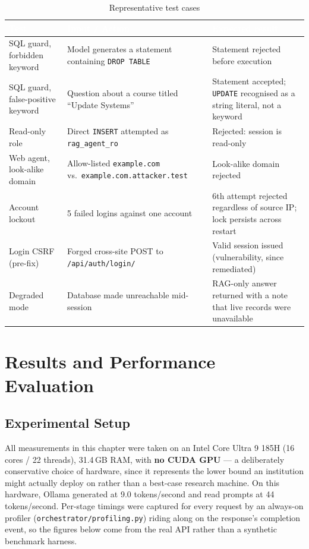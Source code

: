 \documentclass[11pt,a4paper,oneside]{report}
\begin{document}
\begin{table}[h]
\centering
\caption{Representative test cases}
\renewcommand{\arraystretch}{1.4}
\begin{tabularx}{\linewidth}{|>{\raggedright\arraybackslash}p{3.4cm}|X|X|}
\hline
\rowcolor{hdrnavy}
\textcolor{white}{Test} & \textcolor{white}{Input / Action} &
\textcolor{white}{Expected result} \\
\hline
SQL guard, forbidden keyword & Model generates a statement containing
  \texttt{DROP TABLE} & Statement rejected before execution \\
\hline
SQL guard, false-positive keyword & Question about a course titled
  ``Update Systems'' & Statement accepted; \texttt{UPDATE} recognised as a
  string literal, not a keyword \\
\hline
Read-only role & Direct \texttt{INSERT} attempted as
  \texttt{rag\_agent\_ro} & Rejected: session is read-only \\
\hline
Web agent, look-alike domain & Allow-listed \texttt{example.com}
  vs.\ \texttt{example.com.attacker.test} & Look-alike domain rejected \\
\hline
Account lockout & 5 failed logins against one account & 6th attempt
  rejected regardless of source IP; lock persists across restart \\
\hline
Login CSRF (pre-fix) & Forged cross-site POST to \texttt{/api/auth/login/} &
  Valid session issued (vulnerability, since remediated) \\
\hline
Degraded mode & Database made unreachable mid-session & RAG-only answer
  returned with a note that live records were unavailable \\
\hline
\end{tabularx}
\end{table}

\chapter{Results and Performance Evaluation}

\section{Experimental Setup}

All measurements in this chapter were taken on an Intel Core Ultra 9 185H
(16 cores / 22 threads), 31.4\,GB RAM, with \textbf{no CUDA GPU} --- a
deliberately conservative choice of hardware, since it represents the lower
bound an institution might actually deploy on rather than a
best-case research machine. On this hardware, Ollama generated at 9.0
tokens/second and read prompts at 44 tokens/second. Per-stage timings were
captured for every request by an always-on profiler
(\texttt{orchestrator/profiling.py}) riding along on the response's
completion event, so the figures below come from the real API rather than a
synthetic benchmark harness.
\end{document}

